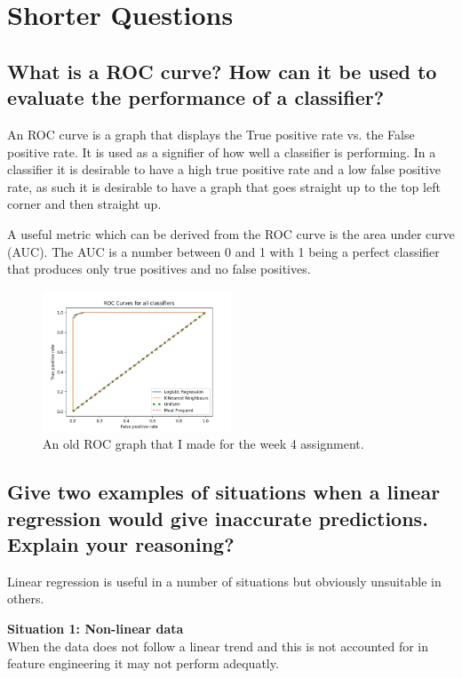 
\section{Shorter Questions}

\subsection{What is a ROC curve? How can it be used to evaluate the performance of a
classifier?}
An ROC curve is a graph that displays the True positive rate vs. the False positive rate. 
It is used as a signifier of how well a classifier is performing.
In a classifier it is desirable to have a high true positive rate and a low false positive rate,
as such it is desirable to have a graph that goes straight up to the top left corner and then straight up.
\par 
A useful metric which can be derived from the ROC curve is the area under curve (AUC).
The AUC is a number between 0 and 1 with 1 being a perfect classifier that produces only true positives and no false positives.

\begin{figure}[H]
    \centering
    \includegraphics[width=0.5\textwidth]{images/Roc1.png}
    \caption{An old ROC graph that I made for the week 4 assignment.}
    \end{figure}
\par


\subsection{Give two examples of situations when a linear regression would give inaccurate
predictions. Explain your reasoning?}

Linear regression is useful in a number of situations but obviously unsuitable in others.
\par

\textbf{Situation 1: Non-linear data\\}
When the data does not follow a linear trend and this is not accounted for in feature engineering it may not perform adequatly.

